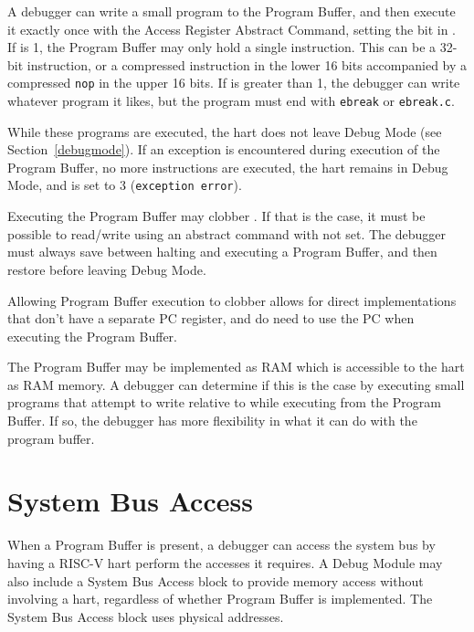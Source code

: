 A debugger can write a small program to the Program Buffer, and then
execute it exactly once with the Access Register Abstract Command,
setting the \Fpostexec bit in \Rcommand.
If \Fprogsize is 1, the Program Buffer may only hold a single instruction.
This can be a 32-bit
instruction, or a compressed instruction in the lower 16 bits accompanied by a
compressed {\tt nop} in the upper 16 bits.  If \Fprogsize is greater than 1,
the debugger can write whatever program it likes, but the program must end with
{\tt ebreak} or {\tt ebreak.c}.

While these programs are executed, the hart does not leave Debug Mode (see
Section~\ref{debugmode}).  If an exception is encountered during execution of
the Program Buffer, no more instructions are executed, the hart remains in Debug
Mode, and \Fcmderr is set to 3 ({\tt exception error}).

Executing the Program Buffer may clobber \Rdpc. If that is the case, it must be
possible to read/write \Rdpc using an abstract command with \Fpostexec not set.
The debugger must always save \Rdpc between halting and
executing a Program Buffer, and then restore \Rdpc before leaving Debug Mode.

\begin{commentary}
    Allowing Program Buffer execution to clobber \Rdpc allows for direct
    implementations that don't have a separate PC register, and do need to use
    the PC when executing the Program Buffer.
\end{commentary}

The Program Buffer may be implemented as RAM which is accessible to the
hart as RAM memory. A debugger can determine if this is the case by executing small
programs that attempt to write relative to \Rpc while executing from the Program Buffer.
If so, the debugger has more flexibility in what it can do with the program buffer.

\section{System Bus Access} \label{systembusaccess}

When a Program Buffer is present, a debugger can access the system bus by having a
RISC-V hart perform the accesses it requires.
A Debug Module may also include a System Bus Access block to provide memory
access without
involving a hart, regardless of whether Program Buffer is implemented.
The System Bus Access block uses physical addresses.

